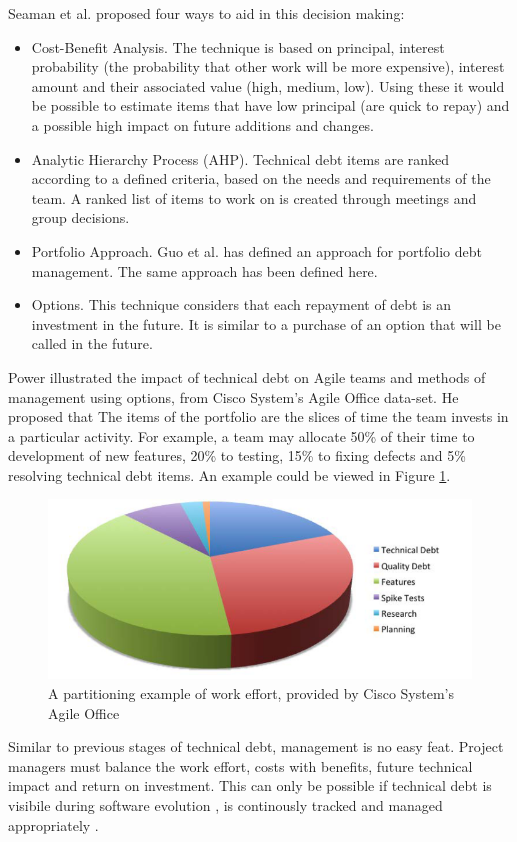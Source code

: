 \documentclass{mprop}
\begin{document}
Seaman et al. \cite{Seaman2012} proposed four ways to aid in this decision
making:
\begin{itemize}
	\item Cost-Benefit Analysis. The technique is based on principal, interest
	probability (the probability that other work will be more expensive),
	interest amount and their associated value (high, medium, low). Using these
	it would be possible to estimate items that have low principal (are quick to
	repay) and a possible high impact on future additions and changes.
	\item Analytic Hierarchy Process (AHP). Technical debt items are ranked
	according to a defined criteria, based on the needs and requirements of the
	team. A ranked list of items to work on is created through meetings and
	group decisions.
	\item Portfolio Approach. Guo et al. \cite{Guo2011} has
	defined an approach for portfolio debt management. The same approach has
	been defined here.
	\item Options. This technique considers that each repayment of debt is an
	investment in the future. It is similar to a purchase of an option
	\cite{option-investopedia} that will be called in the future.
\end{itemize}

Power \cite{Power2013} illustrated the impact of technical debt on Agile teams
and methods of management using options, from Cisco System's Agile Office
data-set. He proposed that The items of the portfolio are the slices of time the
team invests in a particular activity. For example, a team may allocate 50\% of
their time to development of new features, 20\% to testing, 15\% to fixing
defects and 5\% resolving technical debt items. An example could be viewed in
Figure \ref{fig:td-options}.

\begin{figure}
	\centering
	\includegraphics[width=0.5\linewidth]{visualisations/td-options.png}
	\caption{A partitioning example of work effort, provided by Cisco System's Agile Office}
	\label{fig:td-options}
\end{figure}

Similar to previous stages of technical debt, management is no easy feat.
Project managers must balance the work effort, costs with benefits, future
technical impact and return on investment. This can only be possible if
technical debt is visibile during software evolution \cite{Lim2012}
\cite{Morgenthaler2012} \cite{Codabux2013}, is continously tracked and managed
appropriately \cite{Cunningham1993}.
\end{document}
